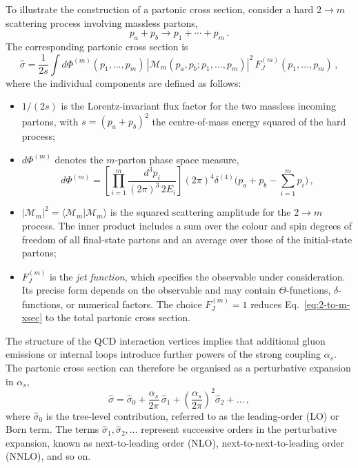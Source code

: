 To illustrate the construction of a partonic cross section, consider a hard
$2\to m$ scattering process involving massless partons,
\[
    p_a + p_b \rightarrow p_1 + \cdots + p_m\,.
\]
The corresponding partonic cross section is
\begin{equation}
\label{eq:2-to-m-xsec}
   \hat{ \sigma}= \frac{1}{2s}\int d\Phi^{(m)}(p_1,\ldots,p_m)\,|\mathcal{M}_m(p_a,p_b; p_1,\ldots,p_m)|^2\,F_J^{(m)}(p_1,\ldots,p_m)\,,
\end{equation}
where the individual components are defined as follows:
\begin{itemize}
    \item $1/(2s)$ is the Lorentz-invariant flux factor for the two
  massless incoming partons, with $s=(p_a+p_b)^2$ the
  centre-of-mass energy squared of the hard process;
  
    \item $d\Phi^{(m)}$ denotes the $m$-parton phase space measure,
\begin{equation}
\label{eq:m-3-phase-space}
d\Phi^{(m)} = \left[\prod_{i=1}^{m} \frac{d^3 p_i}{(2\pi)^3\, 2E_i}\right]
\left(2\pi\right)^4\delta^{(4)}\Big(p_a + p_b - \sum_{i=1}^{m} p_i\Big)\,,
\end{equation}

\item $|\mathcal{M}_m|^2 = \langle\mathcal{M}_m|\mathcal{M}_m\rangle$
  is the squared scattering amplitude for the $2\to m$ process. The
   inner product includes a sum over the colour and spin
  degrees of freedom of all final-state partons and an average
  over those of the initial-state partons;

\item $F_J^{(m)}$ is the \emph{jet function}, which specifies the observable under consideration.
Its precise form depends on the observable
and may contain $\Theta$-functions, $\delta$-functions, or numerical
factors. The choice $F_J^{(m)} = 1$ reduces Eq.~\eqref{eq:2-to-m-xsec} to the total partonic cross section. 
\end{itemize}

The structure of the QCD interaction vertices implies that additional gluon
emissions or internal loops introduce further powers of the strong coupling
$\alpha_s$. The partonic cross section can therefore be organised as a
perturbative expansion in $\alpha_s$,
\begin{equation}
\label{eq:sig-pert-theory}
  \hat\sigma =
  \hat\sigma_0
  +\frac{\alpha_s}{2\pi}\,\hat\sigma_1
  +\left(\frac{\alpha_s}{2\pi}\right)^2\hat\sigma_2
  +\dots\,,
\end{equation}
where $\hat\sigma_0$ is the tree-level contribution, referred to as the
leading-order (LO) or Born term. The terms
$\hat\sigma_1,\hat\sigma_2,\ldots$ represent successive orders in the
perturbative expansion, known as next-to-leading order (NLO),
next-to-next-to-leading order (NNLO), and so on.


